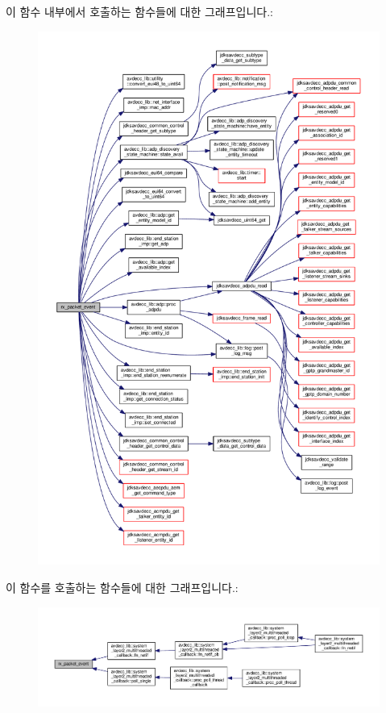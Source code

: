 이 함수 내부에서 호출하는 함수들에 대한 그래프입니다.\+:
\nopagebreak
\begin{figure}[H]
\begin{center}
\leavevmode
\includegraphics[width=350pt]{classavdecc__lib_1_1controller__imp_abc210704762ea3b2cba8422543d3ce44_cgraph}
\end{center}
\end{figure}




이 함수를 호출하는 함수들에 대한 그래프입니다.\+:
\nopagebreak
\begin{figure}[H]
\begin{center}
\leavevmode
\includegraphics[width=350pt]{classavdecc__lib_1_1controller__imp_abc210704762ea3b2cba8422543d3ce44_icgraph}
\end{center}
\end{figure}


